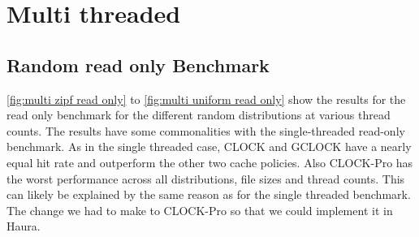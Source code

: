 \documentclass[
	12pt,
	a4paper,
	abstract,
	bibliography=totoc,
	chapterprefix,
	headings=openright,
	numbers=endperiod,
	parskip=half,
	twoside,
]{scrreprt}
\begin{document}
\section{Multi threaded}
\subsection{Random read only Benchmark}

\cref{fig:multi zipf read only} to \cref{fig:multi uniform read only}
show the results for the read only benchmark for the different random distributions at various thread counts.
The results have some commonalities with the single-threaded read-only benchmark.
As in the single threaded case, CLOCK and GCLOCK have a nearly equal hit rate and outperform the other two cache policies.
Also CLOCK-Pro has the worst performance across all distributions, file sizes and thread counts.
This can likely be explained by the same reason as for the single threaded benchmark.
The change we had to make to CLOCK-Pro so that we could implement it in Haura.
\end{document}
